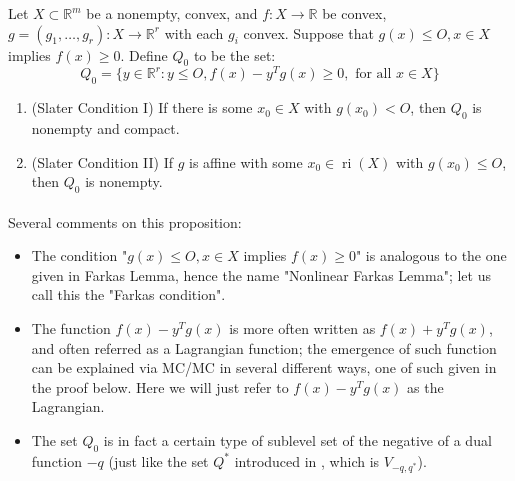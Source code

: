 \begin{prop}\label{prop:041-farkas-lemma-nonlinear}
	Let $X\subset \mathbb{R}^m$ be a nonempty, convex, and $f:X\to \mathbb{R}$ be convex, $g=(g_1,\dotsc,g_r):X\to \mathbb{R}^r$ with each $g_i$ convex. Suppose that $g(x)\leq O,x\in X$ implies $f(x)\geq 0$. Define $Q_0$ to be the set:
	\[
		Q_0=\{y\in \mathbb{R}^r:y\leq O,f(x)-y^Tg(x)\geq0,\text{ for all }x\in X\}
	\]
	\begin{enumerate}[label=(\alph*)]
		\item (Slater Condition I) If there is some $x_0\in X$ with $g(x_0)<O$, then $Q_0$ is nonempty and compact.
		\item (Slater Condition II) If $g$ is affine with some $x_0\in \operatorname{ri}(X)$ with $g(x_0)\leq O$, then $Q_0$ is nonempty.
	\end{enumerate}
\end{prop}

\paragraph{}Several comments on this proposition:
\begin{itemize}
	\item The condition "$g(x)\leq O,x\in X$ implies $f(x)\geq 0$" is analogous to the one given in Farkas Lemma, hence the name "Nonlinear Farkas Lemma"; let us call this the "Farkas condition".
	\item The function $f(x)-y^Tg(x)$ is more often written as $f(x)+y^Tg(x)$, and often referred as a Lagrangian function; the emergence of such function can be explained via MC/MC in several different ways, one of such given in the proof below. Here we will just refer to $f(x)-y^Tg(x)$ as the Lagrangian.
	\item The set $Q_0$ is in fact a certain type of sublevel set of the negative of a dual function $-q$ (just like the set $Q^\ast$ introduced in , which is $V_{-q,q^\ast}$).
\end{itemize}

